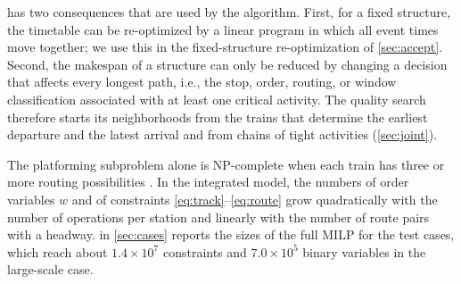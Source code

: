  has two consequences that are used by the algorithm. First, for a fixed structure, the timetable can be re-optimized by a linear program in which all event times move together; we use this in the fixed-structure re-optimization of \cref{sec:accept}. Second, the makespan of a structure can only be reduced by changing a decision that affects every longest path, i.e., the stop, order, routing, or window classification associated with at least one critical activity. The quality search therefore starts its neighborhoods from the trains that determine the earliest departure and the latest arrival and from chains of tight activities (\cref{sec:joint}).

\begin{remark}\label{rem:size}
The platforming subproblem alone is NP-complete when each train has three or more routing possibilities \citep{Kroon1997}. In the integrated model, the numbers of order variables $w$ and of constraints \eqref{eq:track}--\eqref{eq:route} grow quadratically with the number of operations per station and linearly with the number of route pairs with a headway.  in \cref{sec:cases} reports the sizes of the full MILP for the test cases, which reach about $1.4\times10^7$ constraints and $7.0\times10^5$ binary variables in the large-scale case.
\end{remark}
